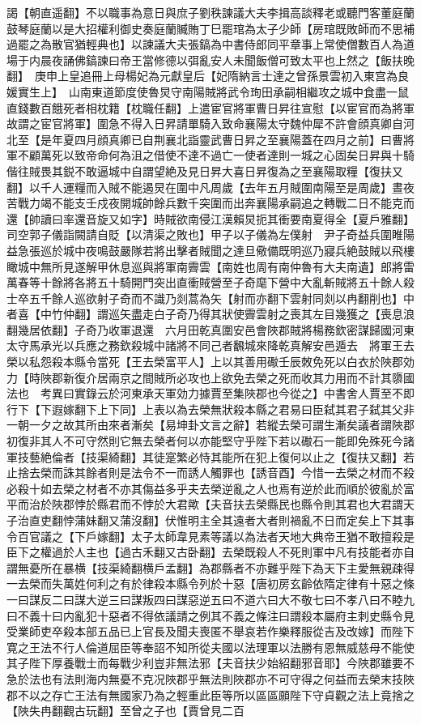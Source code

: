 謁【朝直遥翻】不以職事為意日與庶子劉秩諫議大夫李揖高談釋老或聽門客董庭蘭鼓琴庭蘭以是大招權利御史奏庭蘭贓賄丁巳罷琯為太子少師【房琯既敗師而不思補過罷之為散官猶輕典也】以諫議大夫張鎬為中書侍郎同平章事上常使僧數百人為道場于内晨夜誦佛鎬諫曰帝王當修德以弭亂安人未聞飯僧可致太平也上然之【飯扶晚翻】　庚申上皇追冊上母楊妃為元獻皇后【妃隋納言士達之曾孫景雲初入東宫為良媛實生上】　山南東道節度使魯炅守南陽賊將武令珣田承嗣相繼攻之城中食盡一鼠直錢數百餓死者相枕籍【枕職任翻】上遣宦官將軍曹日昇往宣慰【以宦官而為將軍故謂之宦官將軍】圍急不得入日昇請單騎入致命襄陽太守魏仲犀不許會顔真卿自河北至【是年夏四月顔真卿已自荆襄北詣靈武曹日昇之至襄陽蓋在四月之前】曰曹將軍不顧萬死以致帝命何為沮之借使不達不過亡一使者達則一城之心固矣日昇與十騎偕往賊畏其鋭不敢逼城中自謂望絶及見日昇大喜日昇復為之至襄陽取糧【復扶又翻】以千人運糧而入賊不能遏炅在圍中凡周歲【去年五月賊圍南陽至是周歲】晝夜苦戰力竭不能支壬戍夜開城帥餘兵數千突圍而出奔襄陽承嗣追之轉戰二日不能克而還【帥讀曰率還音旋又如字】時賊欲南侵江漢賴炅扼其衝要南夏得全【夏戶雅翻】　司空郭子儀詣闕請自貶【以清渠之敗也】甲子以子儀為左僕射　尹子奇益兵圍睢陽益急張巡於城中夜鳴鼓嚴隊若將出擊者賊聞之達旦儆備既明巡乃寢兵絶鼓賊以飛樓瞰城中無所見遂解甲休息巡與將軍南霽雲【南姓也周有南仲魯有大夫南遺】郎將雷萬春等十餘將各將五十騎開門突出直衝賊營至子奇麾下營中大亂斬賊將五十餘人殺士卒五千餘人巡欲射子奇而不識乃剡蒿為矢【射而亦翻下雲射同剡以冉翻削也】中者喜【中竹仲翻】謂巡矢盡走白子奇乃得其狀使霽雲射之喪其左目幾獲之【喪息浪翻幾居依翻】子奇乃收軍退還　六月田乾真圍安邑會陜郡賊將楊務欽密謀歸國河東太守馬承光以兵應之務欽殺城中諸將不同己者飜城來降乾真解安邑遁去　將軍王去榮以私怨殺本縣令當死【王去榮富平人】上以其善用礮壬辰敇免死以白衣於陜郡効力【時陜郡新復介居兩京之間賊所必攻也上欲免去榮之死而收其力用而不計其隳國法也　考異曰實錄云於河東承天軍効力據賈至集陜郡也今從之】中書舍人賈至不即行下【下遐嫁翻下上下同】上表以為去榮無狀殺本縣之君易曰臣弑其君子弑其父非一朝一夕之故其所由來者漸矣【易坤卦文言之辭】若縱去榮可謂生漸矣議者謂陜郡初復非其人不可守然則它無去榮者何以亦能堅守乎陛下若以礮石一能即免殊死今諸軍技藝絶倫者【技渠綺翻】其徒寔繁必恃其能所在犯上復何以止之【復扶又翻】若止捨去榮而誅其餘者則是法令不一而誘人觸罪也【誘音酉】今惜一去榮之材而不殺必殺十如去榮之材者不亦其傷益多乎夫去榮逆亂之人也焉有逆於此而順於彼亂於富平而治於陜郡悖於縣君而不悖於大君歟【夫音扶去榮縣民也縣令則其君也大君謂天子治直吏翻悖蒲妹翻又蒲沒翻】伏惟明主全其遠者大者則禍亂不日而定矣上下其事令百官議之【下戶嫁翻】太子太師韋見素等議以為法者天地大典帝王猶不敢擅殺是臣下之權過於人主也【過古禾翻又古卧翻】去榮既殺人不死則軍中凡有技能者亦自謂無憂所在暴横【技渠綺翻横戶孟翻】為郡縣者不亦難乎陛下為天下主愛無親疎得一去榮而失萬姓何利之有於律殺本縣令列於十惡【唐初房玄齡依隋定律有十惡之條一曰謀反二曰謀大逆三曰謀叛四曰謀惡逆五曰不道六曰大不敬七曰不孝八曰不睦九曰不義十曰内亂犯十惡者不得依議請之例其不義之條注曰謂殺本屬府主刺史縣令見受業師吏卒殺本部五品已上官長及聞夫喪匿不舉哀若作樂釋服從吉及改嫁】而陛下寛之王法不行人倫道屈臣等奉詔不知所從夫國以法理軍以法勝有恩無威慈母不能使其子陛下厚養戰士而每戰少利豈非無法邪【夫音扶少始紹翻邪音耶】今陜郡雖要不急於法也有法則海内無憂不克况陜郡乎無法則陜郡亦不可守得之何益而去榮末技陜郡不以之存亡王法有無國家乃為之輕重此臣等所以區區願陛下守貞觀之法上竟捨之【陜失冉翻觀古玩翻】至曾之子也【賈曾見二百